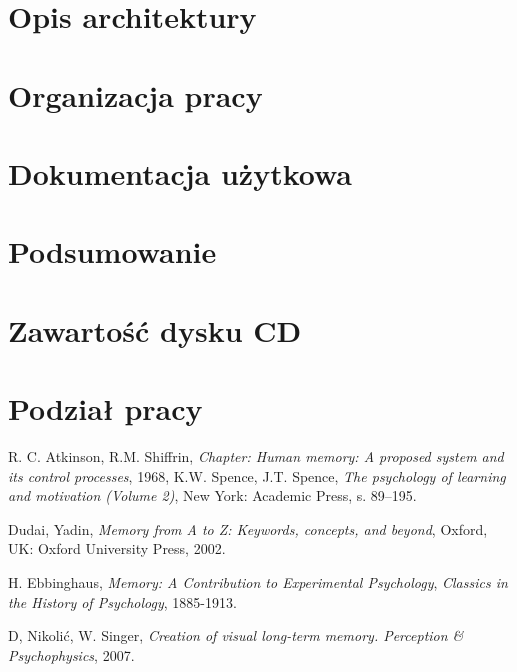 \documentclass{pracamgr}
\begin{document}
\chapter{Opis architektury}\label{r:architecture}

\chapter{Organizacja pracy}\label{r:org}

\chapter{Dokumentacja użytkowa}\label{r:documentation}

\chapter{Podsumowanie}

\appendix

\chapter{Zawartość dysku CD}

\chapter{Podział pracy}

\begin{thebibliography}{99}

 R. C. Atkinson, R.M. Shiffrin, \textit{Chapter: Human memory: A proposed system and its control processes}, 1968, K.W. Spence, J.T. Spence, \textit{The psychology of learning and motivation (Volume 2)}, New York: Academic Press, s. 89–195.

 Dudai, Yadin, \textit{Memory from A to Z: Keywords, concepts, and beyond}, Oxford, UK: Oxford University Press, 2002.

 H. Ebbinghaus, \textit{Memory: A Contribution to Experimental Psychology}, \textit{Classics in the History of Psychology}, 1885-1913.


 D, Nikolić, W. Singer, \textit{Creation of visual long-term memory. Perception \& Psychophysics}, 2007.


\end{thebibliography}
\end{document}
